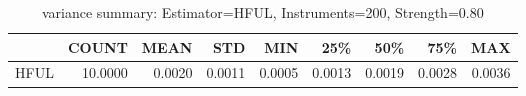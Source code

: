 \begin{table}[ht]
\centering
\caption{variance summary: Estimator=HFUL, Instruments=200, Strength=0.80}
\begin{tabular}{lrrrrrrrr}
\toprule
 & COUNT & MEAN & STD & MIN & 25\% & 50\% & 75\% & MAX \\
\midrule
HFUL & 10.0000 & 0.0020 & 0.0011 & 0.0005 & 0.0013 & 0.0019 & 0.0028 & 0.0036 \\
\bottomrule
\end{tabular}
\end{table}
